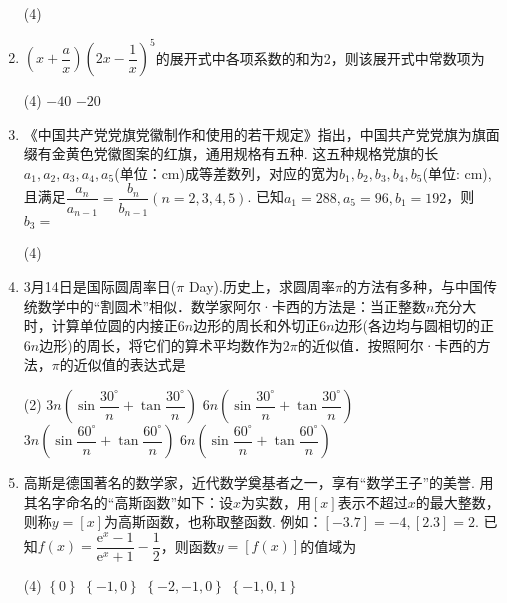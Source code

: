 \documentclass[11pt]{article}
\begin{document}
\begin{enumerate}
	\begin{tasks}(4)
	\end{tasks}
	\item $ \left ( x+\dfrac{a}{x}  \right ) \left ( 2x-\dfrac{1}{x}  \right ) ^5 $的展开式中各项系数的和为2，则该展开式中常数项为
	\begin{tasks}(4)
		\task $ -40 $
		\task $ -20 $
	\end{tasks}
	\item 《中国共产党党旗党徽制作和使用的若干规定》指出，中国共产党党旗为旗面缀有金黄色党徽图案的红旗，通用规格有五种. 这五种规格党旗的长$ a_1,a_2,a_3,a_4,a_5 $(单位：cm)成等差数列，对应的宽为$ 
	b_1,b_2,b_3,b_4,b_5 $(单位: cm),且满足$ \dfrac{a_n}{a_{n-1}}=\dfrac{b_n}{b_{n-1}}(n=2,3,4,5) $. 已知$ a_1=288,a_5=96,b_1=192 $，则$ b_3= $
	\begin{tasks}(4)
	\end{tasks}
	\item 3月14日是国际圆周率日($ \pi $ Day).历史上，求圆周率$ \pi $的方法有多种，与中国传统数学中的“割圆术”相似．数学家阿尔·卡西的方法是：当正整数$ n $充分大时，计算单位圆的内接正$ 6n $边形的周长和外切正$ 6n $边形(各边均与圆相切的正$ 6n $边形)的周长，将它们的算术平均数作为$ 2\pi $的近似值．按照阿尔·卡西的方法，$ \pi $的近似值的表达式是
	\begin{tasks}(2)
		\task $ 3n\left ( \sin \dfrac{30^\circ }{n} +\tan \dfrac{30^\circ }{n}  \right )  $
		\task $ 6n\left ( \sin \dfrac{30^\circ }{n} +\tan \dfrac{30^\circ }{n}  \right )  $
		\task $ 3n\left ( \sin \dfrac{60^\circ }{n} +\tan \dfrac{60^\circ }{n}  \right )  $
		\task $ 6n\left ( \sin \dfrac{60^\circ }{n} +\tan \dfrac{60^\circ }{n}  \right )  $
	\end{tasks}
	\item 高斯是德国著名的数学家，近代数学奠基者之一，享有“数学王子”的美誉. 用其名字命名的“高斯函数”如下：设$ x $为实数，用$ \left [ x\right ]  $表示不超过$ x $的最大整数，则称$ y= \left [ x\right ]   $为高斯函数，也称取整函数. 例如：$  \left [ -3.7\right ]  =-4, \left [ 2.3\right ] =2 $. 已知$ f(x)=\dfrac{\mathrm{e}^x-1 }{\mathrm{e}^x+1} -\dfrac{1}{2}  $，则函数$ y=\left [ f(x)\right ] $的值域为
	\begin{tasks}(4)
		\task $ \left \{ 0 \right \}  $
		\task $ \left \{ -1,0 \right \}  $
		\task $ \left \{ -2,-1,0 \right \}  $
		\task $ \left \{ -1,0,1 \right \}  $
	\end{tasks}


\end{enumerate}
\end{document}

